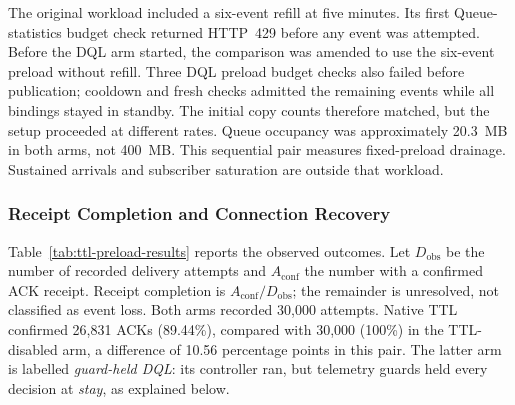 The original workload included a six-event refill at five minutes. Its first
Queue-statistics budget check returned HTTP~429 before any event was attempted.
Before the DQL arm started, the comparison was amended to use the six-event
preload without refill. Three DQL preload budget checks also failed before
publication; cooldown and fresh checks admitted the remaining events while all
bindings stayed in standby. The initial copy counts therefore matched, but the setup proceeded at
different rates. Queue occupancy was approximately 20.3~MB in both arms, not
400~MB. This sequential pair measures fixed-preload drainage. Sustained
arrivals and subscriber saturation are outside that workload.

\subsubsection{Receipt Completion and Connection Recovery}

Table~\ref{tab:ttl-preload-results} reports the observed outcomes. Let
$D_{\mathrm{obs}}$ be the number of recorded delivery attempts and
$A_{\mathrm{conf}}$ the number with a confirmed ACK receipt. Receipt completion is
$A_{\mathrm{conf}}/D_{\mathrm{obs}}$; the remainder is unresolved, not classified as
event loss. Both arms recorded 30,000 attempts. Native TTL confirmed 26,831 ACKs
(89.44\%), compared with 30,000 (100\%) in the TTL-disabled arm, a difference of
10.56 percentage points in this pair. The latter arm is labelled
\emph{guard-held DQL}: its controller ran, but telemetry guards held every
decision at \emph{stay}, as explained below.

